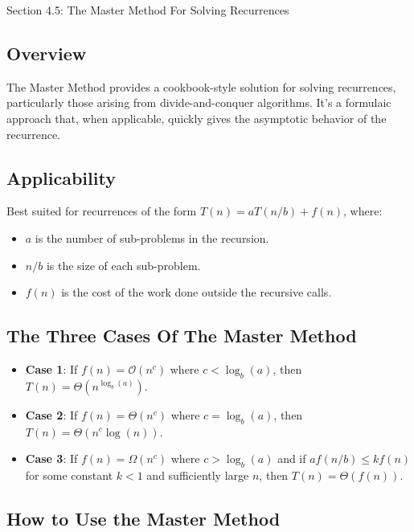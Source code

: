 \begin{notes}{Section 4.5: The Master Method For Solving Recurrences}
    \subsection*{Overview}

    The Master Method provides a cookbook-style solution for solving recurrences, particularly those arising from divide-and-conquer algorithms. It's a formulaic approach that, when applicable, quickly 
    gives the asymptotic behavior of the recurrence. \vspace*{1em}

    \subsection*{Applicability}

    Best suited for recurrences of the form $T(n) = aT(n / b) + f(n)$, where:

    \begin{itemize}
        \item $a$ is the number of sub-problems in the recursion.
        \item $n / b$ is the size of each sub-problem.
        \item $f(n)$ is the cost of the work done outside the recursive calls.
    \end{itemize}

    \subsection*{The Three Cases Of The Master Method}

    \begin{itemize}
        \item \textbf{Case 1}: If $f(n) = \mathcal{O}(n^{c})$ where $c < \log_{b}{(a)}$, then $T(n) = \Theta(n^{\log_{b}{(a)}})$.
        \item \textbf{Case 2}: If $f(n) = \Theta(n^{c})$ where $c = \log_{b}{(a)}$, then $T(n) = \Theta(n^{c}\log{(n)})$.
        \item \textbf{Case 3}: If $f(n) = \Omega(n^{c})$ where $c > \log_{b}{(a)}$ and if $af(n / b) \leq kf(n)$ for some constant $k < 1$ and sufficiently large $n$, then $T(n) = \Theta(f(n))$.
    \end{itemize}

    \subsection*{How to Use the Master Method}


\end{notes}
